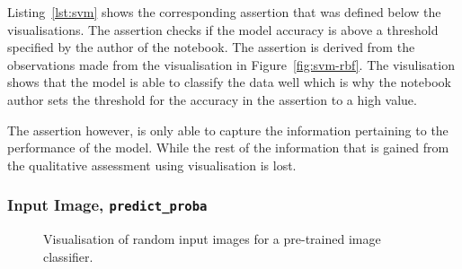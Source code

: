 \documentclass[conference]{IEEEtran}
\begin{document}
Listing~\ref{lst:svm} shows the corresponding assertion that was defined below the visualisations. The assertion checks if the model accuracy is above a threshold specified by the author of the notebook. The assertion is derived from the observations made from the visualisation in Figure~\ref{fig:svm-rbf}. The visulisation shows that the model is able to classify the data well which is why the notebook author sets the threshold for the accuracy in the assertion to a high value.

The assertion however, is only able to capture the information pertaining to the performance of the model. While the rest of the information that is gained from the qualitative assessment using visualisation is lost.

\subsubsection{Input Image, \texttt{predict\_proba}}

\begin{figure}
  \hfill
  \caption{Visualisation of random input images for a pre-trained image classifier.}\label{fig:balls}
\end{figure}
\end{document}
